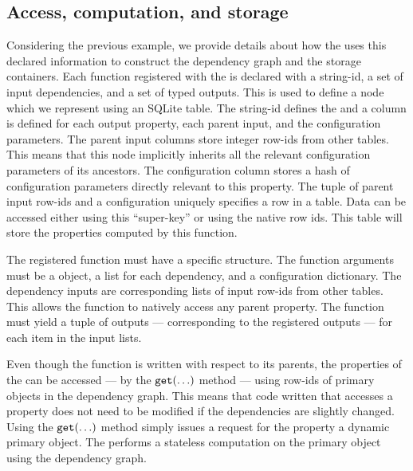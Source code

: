     \subsection{Access, computation, and storage}
    Considering the previous example, we provide details about how the
      \depcache{} uses this declared information to construct the dependency
      graph and the storage containers.
    Each function registered with the \depcache{} is declared with a
      string-id, a set of input dependencies, and a set of typed outputs.
    This is used to define a node which we represent using an SQLite table.
    The string-id defines the \tablename{} and a column is defined for each
      output property, each parent input, and the configuration parameters.
    The parent input columns store integer row-ids from other tables.
    This means that this node implicitly inherits all the relevant
      configuration parameters of its ancestors.
    The configuration column stores a hash of configuration parameters
      directly relevant to this property.
    The tuple of parent input row-ids and a configuration uniquely specifies a
      row in a table.
    Data can be accessed either using this ``super-key'' or using the native
      row ids.
    This table will store the properties computed by this function.

    The registered function must have a specific structure.
    The function arguments must be a \depcache{} object, a list for each
      dependency, and a configuration dictionary.
    The dependency inputs are corresponding lists of input row-ids from other
      tables.
    This allows the function to natively access any parent property.
    The function must yield a tuple of outputs --- corresponding to the
      registered outputs --- for each item in the input lists.

    Even though the function is written with respect to its parents, the
      properties of the \depcache{} can be accessed --- by the
      $\tt{get(\ldots)}$ method --- using row-ids of primary objects in the
      dependency graph.
    This means that code written that accesses a property does not need to be
      modified if the dependencies are slightly changed.
    Using the $\tt{get(\ldots)}$ method simply issues a request for the
      property a dynamic primary object.
    The \depcache{} performs a stateless computation on the primary object
      using the dependency graph.

